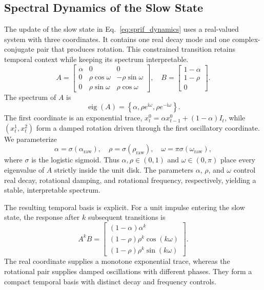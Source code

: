 \documentclass[letterpaper]{article} %
\begin{document}
\subsection{Spectral Dynamics of the Slow State}

The update of the slow state in Eq.~\eqref{eq:sprif_dynamics} uses a real-valued system with three coordinates. It contains one real decay mode and one complex-conjugate pair that produces rotation. This constrained transition retains temporal context while keeping its spectrum interpretable.
\begin{equation}
A=
\begin{bmatrix}
\alpha & 0 & 0\\
0 & \rho\cos\omega & -\rho\sin\omega\\
0 & \rho\sin\omega & \rho\cos\omega
\end{bmatrix},\quad
B=
\begin{bmatrix}
1-\alpha\\ 1-\rho\\ 0
\end{bmatrix}.
\label{eq:spectral_matrix}
\end{equation}
The spectrum of $A$ is
\begin{equation}
\operatorname{eig}(A)=\left\{\alpha,\rho e^{\mathrm{i}\omega},\rho e^{-\mathrm{i}\omega}\right\}.
\label{eq:spectral_eigenvalues}
\end{equation}
The first coordinate is an exponential trace, $x_t^0=\alpha x_{t-1}^0+(1-\alpha)I_t$, while $(x_t^1,x_t^2)$ form a damped rotation driven through the first oscillatory coordinate. We parameterize
\begin{equation}
\alpha=\sigma(\alpha_{\mathrm{raw}}),\quad
\rho=\sigma(\rho_{\mathrm{raw}}),\quad
\omega=\pi\sigma(\omega_{\mathrm{raw}}),
\label{eq:parameterization}
\end{equation}
where $\sigma$ is the logistic sigmoid. Thus $\alpha,\rho\in(0,1)$ and $\omega\in(0,\pi)$ place every eigenvalue of $A$ strictly inside the unit disk. The parameters $\alpha$, $\rho$, and $\omega$ control real decay, rotational damping, and rotational frequency, respectively, yielding a stable, interpretable spectrum.

The resulting temporal basis is explicit. For a unit impulse entering the slow state, the response after $k$ subsequent transitions is
\begin{equation}
A^kB=
\begin{bmatrix}
(1-\alpha)\alpha^k\\
(1-\rho)\rho^k\cos(k\omega)\\
(1-\rho)\rho^k\sin(k\omega)
\end{bmatrix}.
\label{eq:spectral_impulse_response}
\end{equation}
The real coordinate supplies a monotone exponential trace, whereas the rotational pair supplies damped oscillations with different phases. They form a compact temporal basis with distinct decay and frequency controls.
\end{document}
